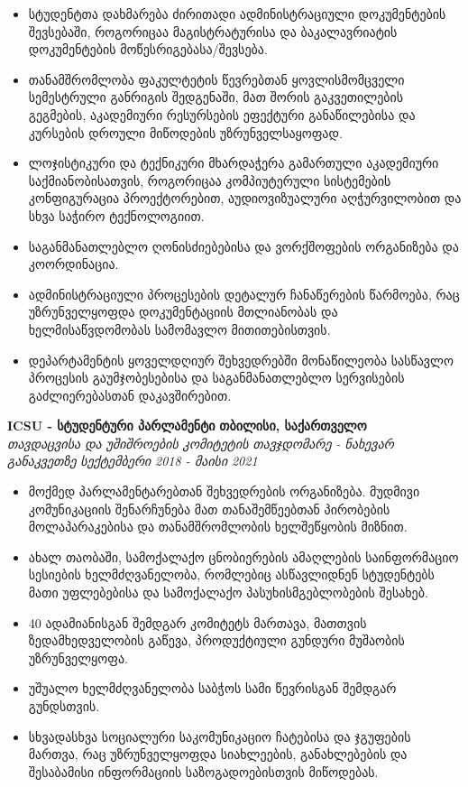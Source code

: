 \documentclass[10pt,letterpaper]{article}
\begin{document}
\begin{itemize}
    \begin{itemize}[label=\textbullet]
    \itemsep0.5em
    \item სტუდენტთა დახმარება ძირითადი ადმინისტრაციული დოკუმენტების შევსებაში, როგორიცაა მაგისტრატურისა და ბაკალავრიატის დოკუმენტების მოწესრიგებასა/შევსება.
    \item თანამშრომლობა ფაკულტეტის წევრებთან ყოვლისმომცველი სემესტრული განრიგის შედგენაში, მათ შორის გაკვეთილების გეგმების, აკადემიური რესურსების ეფექტური განაწილებისა და კურსების დროული მიწოდების უზრუნველსაყოფად.
    \item ლოჯისტიკური და ტექნიკური მხარდაჭერა გამართული აკადემიური საქმიანობისათვის, როგორიცაა კომპიუტერული სისტემების კონფიგურაცია პროექტორებით, აუდიოვიზუალური აღჭურვილობით და სხვა საჭირო ტექნოლოგიით.
    \item საგანმანათლებლო ღონისძიებებისა და ვორქშოფების ორგანიზება და კოორდინაცია.
    \item ადმინისტრაციული პროცესების დეტალურ ჩანაწერების წარმოება, რაც უზრუნველყოფდა დოკუმენტაციის მთლიანობას და ხელმისაწვდომობას სამომავლო მითითებისთვის.
    \item დეპარტამენტის ყოველდღიურ შეხვედრებში მონაწილეობა სასწავლო პროცესის გაუმჯობესებისა და საგანმანათლებლო სერვისების გაძლიერებასთან დაკავშირებით.
    \end{itemize}

    {\textbf{ICSU - სტუდენტური პარლამენტი} \hfill
      \textbf{თბილისი, საქართველო}}
    \\
    {\emph{თავდაცვისა და უშიშროების კომიტეტის თავჯდომარე - ნახევარ განაკვეთზე} \hfill \emph{სექტემბერი 2018 - მაისი 2021}}

    \begin{itemize}[label=\textbullet]
    \itemsep0.5em

    \item მოქმედ პარლამენტარებთან შეხვედრების ორგანიზება. მუდმივი კომუნიკაციის შენარჩუნება მათ თანაშემწეებთან პირობების მოლაპარაკებისა და თანამშრომლობის ხელშეწყობის მიზნით.
    \item ახალ თაობაში, სამოქალაქო ცნობიერების ამაღლების საინფორმაციო სესიების ხელმძღვანელობა, რომლებიც ასწავლიდნენ სტუდენტებს მათი უფლებებისა და სამოქალაქო პასუხისმგებლობების შესახებ.
    \item 40 ადამიანისგან შემდგარ კომიტეტს მართავა, მათთვის ზედამხედველობის გაწევა, პროდუქტიული გუნდური მუშაობის უზრუნველყოფა.
    \item უშუალო ხელმძღვანელობა საბჭოს სამი წევრისგან შემდგარ გუნდსთვის.
    \item სხვადასხვა სოციალური საკომუნიკაციო ჩატებისა და ჯგუფების მართვა, რაც უზრუნველყოფდა სიახლეების, განახლებების და შესაბამისი ინფორმაციის საზოგადოებისთვის მიწოდებას.
    \end{itemize}

    
\end{itemize}
\end{document}
